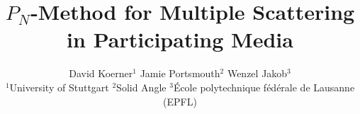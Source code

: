 

\title%
{
$P_N$-Method for Multiple Scattering in Participating Media
}


\author[D. Koerner \& J. Portsmouth \& W. Jakob]
{
David Koerner$^{1}$
\qquad Jamie Portsmouth$^{2}$
\qquad Wenzel Jakob$^{3}$
\\
$^1$University of Stuttgart
\qquad $^2$Solid Angle
\qquad $^3$\'{E}cole polytechnique f\'{e}d\'{e}rale de Lausanne (EPFL)
}



%



